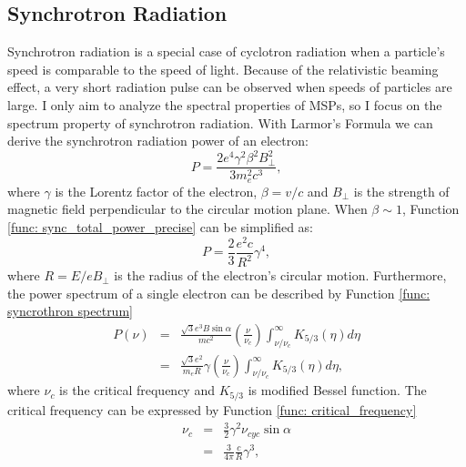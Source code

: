 \documentclass[a4paper, 12pt]{report}
\begin{document}
    \subsection{Synchrotron Radiation}
      Synchrotron radiation is a special case of cyclotron radiation when a particle's
      speed is comparable to the speed of light. Because of the relativistic beaming 
      effect, a very short radiation pulse can be observed when speeds of particles are
      large. I only aim to analyze the spectral properties of MSPs, so I focus on the 
      spectrum property of synchrotron radiation. 
      With Larmor's Formula we can derive the synchrotron radiation power of an electron:
      \begin{equation}
        \label{func: sync_total_power_precise}
        P = \frac{2e^4\gamma^2\beta^2B_{\perp}^2}{3m_e^2c^3} ,
      \end{equation}
      where $\gamma$ is the Lorentz factor of the electron, $\beta=v/c$ and $B_{\perp}$ 
      is the strength of magnetic field perpendicular to the circular motion plane. 
      When $\beta \sim 1$, Function \ref{func: sync_total_power_precise} can be 
      simplified as:
      \begin{equation}
        \label{func: sync_total_power_simplified}
        P = \frac{2}{3}\frac{e^2c}{R^2}\gamma^4 ,
      \end{equation}
      where $R = E / e B_{\perp}$ is the radius of the electron's circular motion. 
      Furthermore, the power spectrum of a single electron  
      can be described by Function \ref{func: syncrothron spectrum}
      \begin{eqnarray}
        \label{func: syncrothron spectrum}
        P\left(\nu\right) &=& \frac{\sqrt{3} e^3 B \sin{\alpha}}{m c^2} 
          \left(\frac{\nu}{\nu_c}\right) \int_{\nu / \nu_c}^{\infty} K_{5/3}\left(\eta \right)d\eta  \nonumber \\
          &=& \frac{\sqrt{3}e^2}{m_eR}\gamma \left(\frac{\nu}{\nu_c}\right) \int_{\nu / \nu_c}^{\infty} K_{5/3}\left(\eta \right)d\eta ,
      \end{eqnarray}
      where $\nu_c$ is the critical frequency and $K_{5/3}$ is modified Bessel function. 
      The critical frequency can be expressed by Function \ref{func: critical_frequency}
      \begin{eqnarray}
        \label{func: critical_frequency}
        \nu_c &=& \frac{3}{2} \gamma^2 \nu_{cyc} \sin{\alpha} \nonumber \\
              &=& \frac{3}{4\pi} \frac{c}{R} \gamma^3 ,
      \end{eqnarray} 
\end{document}
